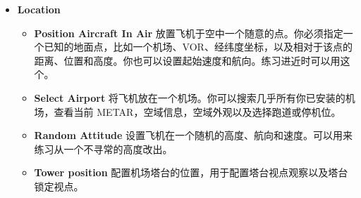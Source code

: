 \begin{itemize}
\ifchinese
\item \textbf{Location}
 \begin{itemize}
   \item \textbf{Position Aircraft In Air} 放置飞机于空中一个随意的点。你必须指定一个已知的地面点，比如一个机场、VOR、经纬度坐标，以及相对于该点的距离、位置和高度。你也可以设置起始速度和航向。练习进近时可以用这个。
   \item \textbf{Select Airport} 将飞机放在一个机场。你可以搜索几乎所有你已安装的机场，查看当前 METAR，空域信息，空域外观以及选择跑道或停机位。
   \item \textbf{Random Attitude} 设置飞机在一个随机的高度、航向和速度。可以用来练习从一个不寻常的高度改出。
    \item \textbf{Tower position} 配置机场塔台的位置，用于配置塔台视点观察以及塔台锁定视点。
\end{itemize}
\fi

{}
\end{itemize}
